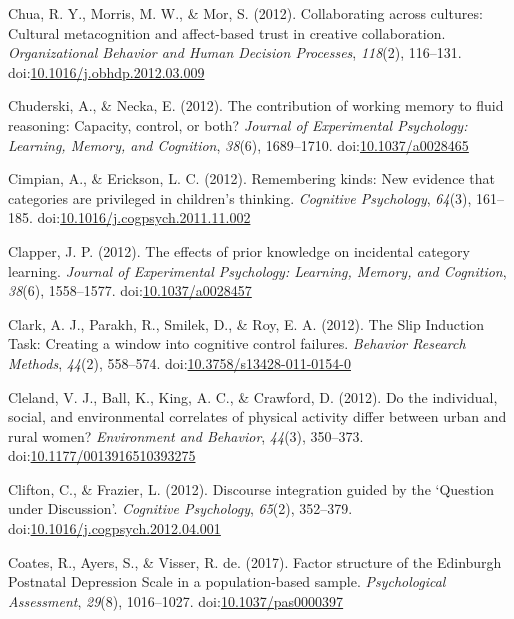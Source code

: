 \documentclass[english,man]{apa6}
\theoremstyle{definition}
\theoremstyle{definition}
\theoremstyle{definition}
\theoremstyle{remark}
\begin{document}
\hypertarget{ref-Chua2012}{}
Chua, R. Y., Morris, M. W., \& Mor, S. (2012). Collaborating across
cultures: Cultural metacognition and affect-based trust in creative
collaboration. \emph{Organizational Behavior and Human Decision
Processes}, \emph{118}(2), 116--131.
doi:\href{https://doi.org/10.1016/j.obhdp.2012.03.009}{10.1016/j.obhdp.2012.03.009}

\hypertarget{ref-Chuderski2012}{}
Chuderski, A., \& Necka, E. (2012). The contribution of working memory
to fluid reasoning: Capacity, control, or both? \emph{Journal of
Experimental Psychology: Learning, Memory, and Cognition}, \emph{38}(6),
1689--1710.
doi:\href{https://doi.org/10.1037/a0028465}{10.1037/a0028465}

\hypertarget{ref-Cimpian2012}{}
Cimpian, A., \& Erickson, L. C. (2012). Remembering kinds: New evidence
that categories are privileged in children's thinking. \emph{Cognitive
Psychology}, \emph{64}(3), 161--185.
doi:\href{https://doi.org/10.1016/j.cogpsych.2011.11.002}{10.1016/j.cogpsych.2011.11.002}

\hypertarget{ref-Clapper2012}{}
Clapper, J. P. (2012). The effects of prior knowledge on incidental
category learning. \emph{Journal of Experimental Psychology: Learning,
Memory, and Cognition}, \emph{38}(6), 1558--1577.
doi:\href{https://doi.org/10.1037/a0028457}{10.1037/a0028457}

\hypertarget{ref-Clark2012}{}
Clark, A. J., Parakh, R., Smilek, D., \& Roy, E. A. (2012). The Slip
Induction Task: Creating a window into cognitive control failures.
\emph{Behavior Research Methods}, \emph{44}(2), 558--574.
doi:\href{https://doi.org/10.3758/s13428-011-0154-0}{10.3758/s13428-011-0154-0}

\hypertarget{ref-Cleland2012}{}
Cleland, V. J., Ball, K., King, A. C., \& Crawford, D. (2012). Do the
individual, social, and environmental correlates of physical activity
differ between urban and rural women? \emph{Environment and Behavior},
\emph{44}(3), 350--373.
doi:\href{https://doi.org/10.1177/0013916510393275}{10.1177/0013916510393275}

\hypertarget{ref-Clifton2012}{}
Clifton, C., \& Frazier, L. (2012). Discourse integration guided by the
`Question under Discussion'. \emph{Cognitive Psychology}, \emph{65}(2),
352--379.
doi:\href{https://doi.org/10.1016/j.cogpsych.2012.04.001}{10.1016/j.cogpsych.2012.04.001}

\hypertarget{ref-Coates2016}{}
Coates, R., Ayers, S., \& Visser, R. de. (2017). Factor structure of the
Edinburgh Postnatal Depression Scale in a population-based sample.
\emph{Psychological Assessment}, \emph{29}(8), 1016--1027.
doi:\href{https://doi.org/10.1037/pas0000397}{10.1037/pas0000397}
\end{document}
